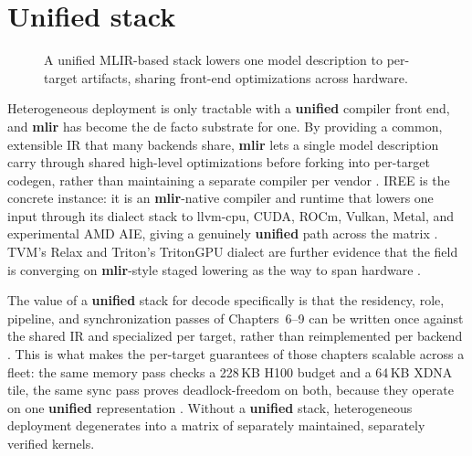 \section{Unified stack}
\label{sec:ch24_unified_stack}


\begin{figure}[t]
\centering
{}
\caption{A unified MLIR-based stack lowers one model description to per-target artifacts, sharing front-end optimizations across hardware.}
\label{fig:unified_stack_architecture}
\end{figure}

Heterogeneous deployment is only tractable with a \textbf{unified} compiler front end, and \textbf{mlir} has become the de facto substrate for one. By providing a common, extensible IR that many backends share, \textbf{mlir} lets a single model description carry through shared high-level optimizations before forking into per-target codegen, rather than maintaining a separate compiler per vendor \citep{iree2024,lai2023relax}. IREE is the concrete instance: it is an \textbf{mlir}-native compiler and runtime that lowers one input through its dialect stack to llvm-cpu, CUDA, ROCm, Vulkan, Metal, and experimental AMD AIE, giving a genuinely \textbf{unified} path across the matrix \citep{iree2024}. TVM's Relax and Triton's TritonGPU dialect are further evidence that the field is converging on \textbf{mlir}-style staged lowering as the way to span hardware \citep{lai2023relax,tillet2019triton}.

The value of a \textbf{unified} stack for decode specifically is that the residency, role, pipeline, and synchronization passes of Chapters~6--9 can be written once against the shared IR and specialized per target, rather than reimplemented per backend \citep{yirage2026,wu2024mirage}. This is what makes the per-target guarantees of those chapters scalable across a fleet: the same memory pass checks a 228\,KB H100 budget and a 64\,KB XDNA tile, the same sync pass proves deadlock-freedom on both, because they operate on one \textbf{unified} representation \citep{nvidia2022hopper,amd2024aie}. Without a \textbf{unified} stack, heterogeneous deployment degenerates into a matrix of separately maintained, separately verified kernels.


